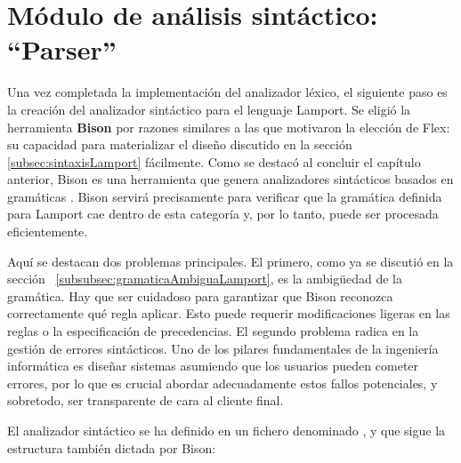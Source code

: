 \section{Módulo de análisis sintáctico: ``Parser''}\label{sec:implementacionParser}
Una vez completada la implementación del analizador léxico, el siguiente paso es la creación del analizador sintáctico para el lenguaje Lamport. Se eligió la herramienta \textbf{Bison} por razones similares a las que motivaron la elección de Flex: su capacidad para materializar el diseño discutido en la sección \ref{subsec:sintaxisLamport} fácilmente. Como se destacó al concluir el capítulo anterior, Bison es una herramienta que genera analizadores sintácticos basados en gramáticas . Bison servirá precisamente para verificar que la gramática definida para Lamport cae dentro de esta categoría y, por lo tanto, puede ser procesada eficientemente.



Aquí se destacan dos problemas principales. El primero, como ya se discutió en la sección ~\ref{subsubsec:gramaticaAmbiguaLamport}, es la ambigüedad de la gramática. Hay que ser cuidadoso para garantizar que Bison reconozca correctamente qué regla aplicar. Esto puede requerir modificaciones ligeras en las reglas o la especificación de precedencias. El segundo problema radica en la gestión de errores sintácticos. Uno de los pilares fundamentales de la ingeniería informática es diseñar sistemas asumiendo que los usuarios pueden cometer errores, por lo que es crucial abordar adecuadamente estos fallos potenciales, y sobretodo, ser transparente de cara al cliente final.



El analizador sintáctico se ha definido en un fichero denominado , y que sigue la estructura también dictada por Bison:

